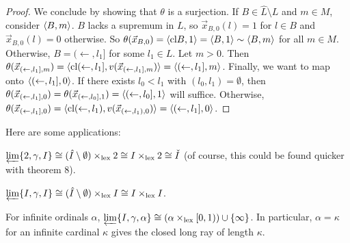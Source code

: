 \documentclass[11pt]{article}
\renewcommand{\cl}{\textrm{cl}}
\newcommand{\lexTimes}{\times_{\textrm{lex}}}
\newcommand{\vect}{\vec}
\begin{document}
\begin{proof}
    We conclude by
    showing that \(\theta\) is a surjection. If \(B\in\hat L\setminus L\)
    and \(m\in M\), consider \(\langle B,m\rangle\).
    \(B\) lacks a supremum in \(L\), so
    \(\vect x_{B,0}(l)=1\) for \(l\in B\) and \(\vect x_{B,0}(l)=0\) otherwise.
    So \(\theta(\vect x_{B,0})=\<\cl B,1\>=\<B,1\>\sim\<B,m\>\) for all
    \(m\in M\). Otherwise, \(B=(\leftarrow,l_1]\) for some \(l_1\in L\).
    Let \(m>0\).
    Then
    \(
      \theta(\vect x_{(\leftarrow,l_1],m})
        =
      \<\cl (\leftarrow,l_1],v(\vect x_{(\leftarrow,l_1],m})\>
        =
      \<(\leftarrow,l_1],m\>
    \).
    Finally, we want to map onto \(\langle(\leftarrow,l_1],0\rangle\).
    If there exists \(l_0<l_1\) with \((l_0,l_1)=\emptyset\), then
    \(
      \theta(\vect x_{(\leftarrow,l_1],0})
        =
      \theta(\vect x_{(\leftarrow,l_0],1})
        =
      \<(\leftarrow,l_0],1\>
    \)
    will suffice. Otherwise,
    \(
      \theta(\vect x_{(\leftarrow,l_1],0})
        =
      \<\cl (\leftarrow,l_1),v(\vect x_{(\leftarrow,l_1),0})\>
        =
      \<(\leftarrow,l_1],0\>
    \).
  \end{proof}

  Here are some applications:

  \begin{example}
    \(
      \varprojlim\{2,\gamma,I\}
        \cong
      (\hat I\setminus\emptyset)\lexTimes 2
        \cong
      I\lexTimes 2
        \cong
      \check I
    \) (of course, this could be found quicker with theorem 8).
  \end{example}

  \begin{example}
    \(
      \varprojlim\{I,\gamma,I\}
        \cong
      (\hat I\setminus\emptyset)\lexTimes I
        \cong
      I\lexTimes I
    \).
  \end{example}

  \begin{example}
    For infinite ordinals \(\alpha\),
    \(
      \varprojlim\{I,\gamma,\alpha\}
        \cong
      (\alpha\lexTimes[0,1))\cup\{\infty\}
    \).
    In particular, \(\alpha=\kappa\) for an infinite cardinal \(\kappa\)
    gives the closed long ray of length \(\kappa\).
  \end{example}



\end{document}

